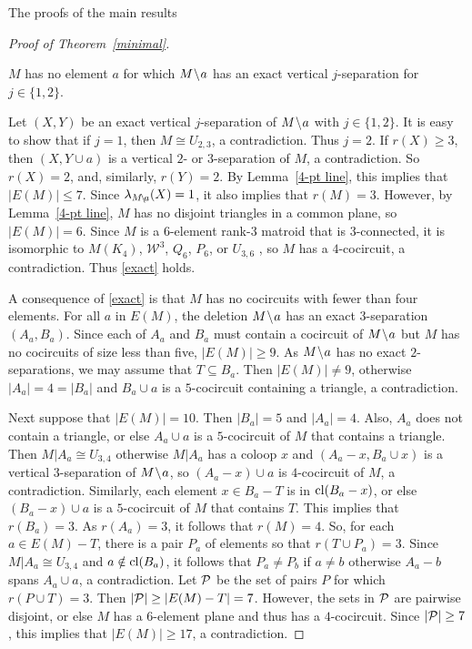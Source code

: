 \documentclass[12pt]{amsart}
\begin{document}
\begin{section}{The proofs of the main results}
\begin{proof}[Proof of Theorem~\ref{minimal}]
\begin{claim} \label{exact}
$M$ has no element $a$ for which $M \!\setminus\! a$ has an exact vertical $j$-separation for $j \in \{1,2\}$.
\end{claim}
Let $(X,Y)$ be an exact vertical $j$-separation of $M \!\setminus\! a$ with $j \in \{1,2\}$.
It is easy to show that if $j = 1$, then $M \cong U_{2,3}$, a contradiction.
Thus $j = 2$.
If $r(X) \ge 3$, then $(X, Y \cup a)$ is a vertical $2$- or $3$-separation of $M$, a contradiction.
So $r(X) = 2$, and, similarly, $r(Y) = 2$.
By Lemma~\ref{4-pt line}, this implies that $|E(M)| \le 7$.
Since $\lambda_{M \!\setminus\! a}(X) = 1$, it also implies that $r(M) = 3$.
However, by Lemma~\ref{4-pt line}, $M$ has no disjoint triangles in a common plane, so $|E(M)| = 6$.
Since $M$ is a $6$-element rank-$3$ matroid that is $3$-connected, it is isomorphic to $M(K_4)$, $\mathcal W^3$, $Q_6$, $P_6$, or $U_{3,6}$ \cite[Corollary 12.2.19]{Oxley}, so $M$ has a $4$-cocircuit, a contradiction.
Thus \ref{exact} holds.

A consequence of \ref{exact} is that $M$ has no cocircuits with fewer than four elements.
For all $a$ in $E(M)$, the deletion $M \!\setminus\! a$ has an exact $3$-separation $(A_a, B_a)$.
Since each of $A_a$ and $B_a$ must contain a cocircuit of $M \!\setminus\! a$ but $M$ has no cocircuits of size less than five, $|E(M)| \ge 9$.
As $M \!\setminus\! a$ has no exact $2$-separations, we may assume that $T \subseteq B_a$.
Then $|E(M)| \ne 9$, otherwise $|A_a| = 4 = |B_a|$ and $B_a \cup a$ is a $5$-cocircuit containing a triangle, a contradiction.


Next suppose that $|E(M)| = 10$.
Then $|B_a| = 5$ and $|A_a| = 4$.
Also, $A_a$ does not contain a triangle, or else $A_a \cup a$ is a $5$-cocircuit of $M$ that contains a triangle.
Then $M|A_a \cong U_{3,4}$ otherwise $M|A_a$ has a coloop $x$ and $(A_a - x, B_a \cup x)$ is a vertical $3$-separation of $M \!\setminus\! a$, so $(A_a - x) \cup a$ is $4$-cocircuit of $M$, a contradiction.
Similarly, each element $x \in B_a - T$ is in $\operatorname{cl}(B_a - x)$, or else $(B_a - x) \cup a$ is a $5$-cocircuit of $M$ that contains $T$.
This implies that $r(B_a) = 3$.
As $r(A_a) = 3$, it follows that $r(M) = 4$.
So, for each $a \in E(M) - T$, there is a pair $P_a$ of elements so that $r(T \cup P_a) = 3$.
Since $M|A_a \cong U_{3,4}$ and $a \notin \operatorname{cl}(B_a)$, it follows that $P_a \ne P_b$ if $a \ne b$ otherwise $A_a - b$ spans $A_a \cup a$, a contradiction.
Let $\mathcal{P}$ be the set of pairs $P$ for which $r(P \cup T) = 3$.
Then $|\mathcal{P}| \ge |E(M) - T| = 7$.
However, the sets in $\mathcal{P}$ are pairwise disjoint, or else $M$ has a $6$-element plane and thus has a $4$-cocircuit.
Since $|\mathcal{P}| \ge 7$, this implies that $|E(M)| \ge 17$, a contradiction.


\end{proof}
\end{section}
\end{document}
